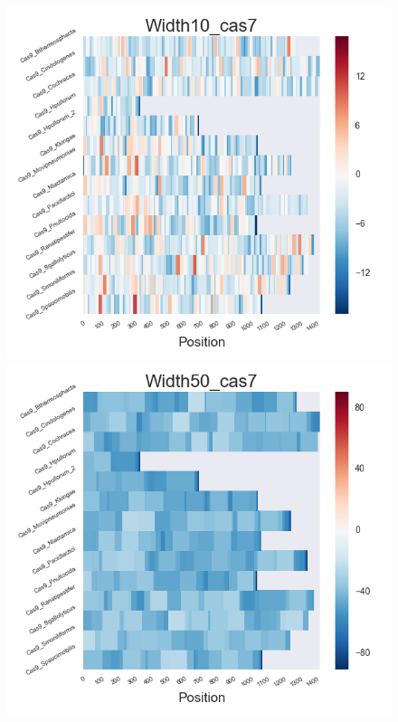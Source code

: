 \documentclass[11pt, oneside]{article}
\begin{document}
\begin{figure}[htbp]
  \centering
  \begin{minipage}{0.32\textwidth}
    \centering
    \includegraphics[width=1\textwidth]{images/Width10_cas7_heatmap} %
  \end{minipage}
  \hfill
  \begin{minipage}{0.32\textwidth}
    \centering
    \includegraphics[width=1\textwidth]{images/Width50_cas7_heatmap} %

\end{minipage}
\end{figure}
\end{document}
